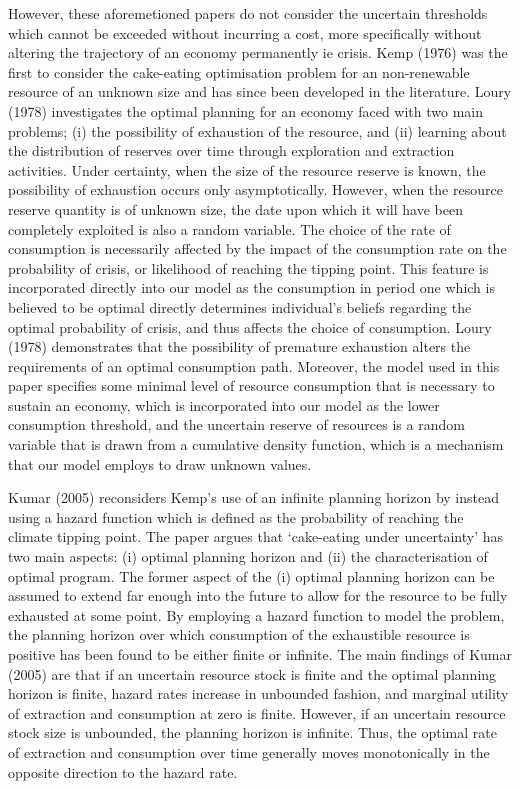 \documentclass[11pt,preprint, authoryear]{elsarticle}
\numberwithin{equation}{section}
\numberwithin{figure}{section}
\numberwithin{table}{section}
\begin{document}
However, these aforemetioned papers do not consider the uncertain
thresholds which cannot be exceeded without incurring a cost, more
specifically without altering the trajectory of an economy permanently
ie crisis. Kemp (1976) was the first to consider the cake-eating
optimisation problem for an non-renewable resource of an unknown size
and has since been developed in the literature. Loury (1978)
investigates the optimal planning for an economy faced with two main
problems; (i) the possibility of exhaustion of the resource, and (ii)
learning about the distribution of reserves over time through
exploration and extraction activities. Under certainty, when the size of
the resource reserve is known, the possibility of exhaustion occurs only
asymptotically. However, when the resource reserve quantity is of
unknown size, the date upon which it will have been completely exploited
is also a random variable. The choice of the rate of consumption is
necessarily affected by the impact of the consumption rate on the
probability of crisis, or likelihood of reaching the tipping point. This
feature is incorporated directly into our model as the consumption in
period one which is believed to be optimal directly determines
individual's beliefs regarding the optimal probability of crisis, and
thus affects the choice of consumption. Loury (1978) demonstrates that
the possibility of premature exhaustion alters the requirements of an
optimal consumption path. Moreover, the model used in this paper
specifies some minimal level of resource consumption that is necessary
to sustain an economy, which is incorporated into our model as the lower
consumption threshold, and the uncertain reserve of resources is a
random variable that is drawn from a cumulative density function, which
is a mechanism that our model employs to draw unknown values.

Kumar (2005) reconsiders Kemp's use of an infinite planning horizon by
instead using a hazard function which is defined as the probability of
reaching the climate tipping point. The paper argues that `cake-eating
under uncertainty' has two main aspects: (i) optimal planning horizon
and (ii) the characterisation of optimal program. The former aspect of
the (i) optimal planning horizon can be assumed to extend far enough
into the future to allow for the resource to be fully exhausted at some
point. By employing a hazard function to model the problem, the planning
horizon over which consumption of the exhaustible resource is positive
has been found to be either finite or infinite. The main findings of
Kumar (2005) are that if an uncertain resource stock is finite and the
optimal planning horizon is finite, hazard rates increase in unbounded
fashion, and marginal utility of extraction and consumption at zero is
finite. However, if an uncertain resource stock size is unbounded, the
planning horizon is infinite. Thus, the optimal rate of extraction and
consumption over time generally moves monotonically in the opposite
direction to the hazard rate.
\end{document}

